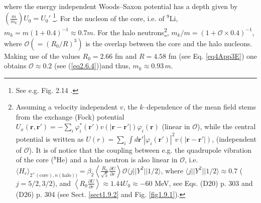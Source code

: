 where the energy independent Woods--Saxon potential has a depth given by\\\mbox{$\left(\frac{m}{m_k}\right)U_0=U_0'$} \footnote{See e.g. Fig. 2.14 \cite{Mahaux:85}.}. For the nucleon of the core, i.e. of $^9$Li, $m_k=m(1+0.4)^{-1}\approx 0.7 m$. For the halo neutrons\footnote{Assuming a velocity independent $v$, the $k$--dependence of the mean field stems from the exchange (Fock)  potential $U_x(\mathbf r, \mathbf r')=-\sum_i\varphi^*_i(\mathbf r')v(|\mathbf r-\mathbf r'|)\varphi_i(\mathbf r)$ (linear in $\mathcal O$), while the central potential is written as $U(r)=\sum_i\int d\mathbf r' |\varphi_i(\mathbf r')|^2v(|\mathbf r- \mathbf r'|)$, (independent of $\mathcal O$). It is of notice that the coupling between e.g. the quadrupole vibration of the core ($^8$He) and a halo neutron is also linear in $\mathcal O$, i.e. $\langle H_c\rangle_{2^+(\text{core}),n (\text{halo}))}=\beta_2\left\langle\frac{R_0}{\sqrt{5}}\frac{\partial U}{\partial r}\right\rangle\mathcal O\langle j||Y^2||1/2\rangle$, where $\langle j||Y^2||1/2\rangle\approx0.7$ ($j=5/2,3/2$), and $\left\langle R_0\frac{\partial U}{\partial r}\right\rangle\approx1.44 U_0\approx -60$ MeV, see \cite{Brink:05} Eqs. (D20) p. 303 and (D26) p. 304 (see Sect. \ref{sect1.9.2} and Fig. \ref{fig1.9.1}).}, $m_k/m=(1+\mathcal O\times0.4)^{-1}$, where $\mathcal O(=(R_0/R)^3)$ is the overlap between the core and the halo nucleons. Making use of the values $R_0=2.66$ fm and $R=4.58$ fm (see Eq. \ref{eq4App3E})  one obtains $\mathcal O\approx0.2$ (see (\ref{eq2.6.4}))and thus,  $m_k\approx 0.93 \,m$.
